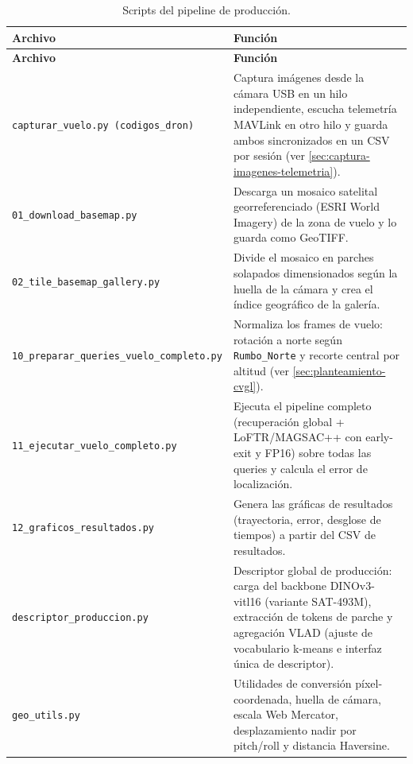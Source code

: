 \begin{longtable}{p{}p{}}
\caption{Scripts del pipeline de producción.}\label{tab:scripts-principal}\\
\toprule
\textbf{Archivo} & \textbf{Función} \\
\midrule
\endfirsthead
\toprule
\textbf{Archivo} & \textbf{Función} \\
\midrule
\endhead
\texttt{capturar\_vuelo.py \newline (codigos\_dron)} & Captura imágenes desde la cámara USB en un hilo independiente, escucha telemetría MAVLink en otro hilo y guarda ambos sincronizados en un CSV por sesión (ver \autoref{sec:captura-imagenes-telemetria}). \\
\texttt{01\_download\_basemap.py} & Descarga un mosaico satelital georreferenciado (ESRI World Imagery) de la zona de vuelo y lo guarda como GeoTIFF. \\
\texttt{02\_tile\_basemap\_\newline gallery.py} & Divide el mosaico en parches solapados dimensionados según la huella de la cámara y crea el índice geográfico de la galería. \\
\texttt{10\_preparar\_queries\_\newline vuelo\_completo.py} & Normaliza los frames de vuelo: rotación a norte según \texttt{Rumbo\_Norte} y recorte central por altitud (ver \autoref{sec:planteamiento-cvgl}). \\
\texttt{11\_ejecutar\_vuelo\_\newline completo.py} & Ejecuta el pipeline completo (recuperación global + LoFTR/MAGSAC++ con early-exit y FP16) sobre todas las queries y calcula el error de localización. \\
\texttt{12\_graficos\_\newline resultados.py} & Genera las gráficas de resultados (trayectoria, error, desglose de tiempos) a partir del CSV de resultados. \\
\texttt{descriptor\_produccion.py} & Descriptor global de producción: carga del backbone DINOv3-vitl16 (variante SAT-493M), extracción de tokens de parche y agregación VLAD (ajuste de vocabulario k-means e interfaz única de descriptor). \\
\texttt{geo\_utils.py} & Utilidades de conversión píxel-coordenada, huella de cámara, escala Web Mercator, desplazamiento nadir por pitch/roll y distancia Haversine. \\
\bottomrule
\end{longtable}

